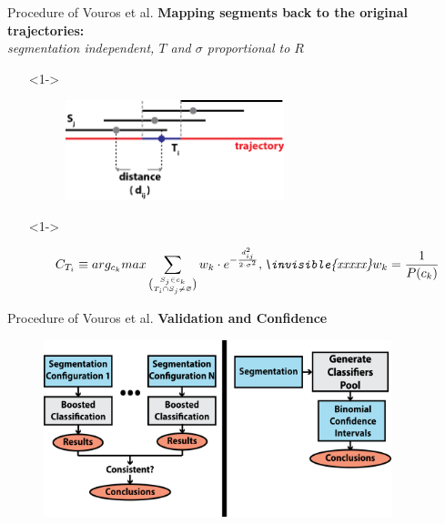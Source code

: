 \documentclass{beamer}
\begin{document}
{\begin{frame}{Procedure of Vouros et al.}
	\textbf{Mapping segments back to the original trajectories:}\\ 
	\textit{segmentation independent, $T$ and $\sigma$ proportional to $R$}
	\vspace{5mm}	
	\begin{itemize}[leftmargin=-2mm]
		\setlength\itemsep{2.3em}
		\item[]<1-> 	
		\begin{figure}[H]
			\centering
			\includegraphics[width=0.6\textwidth]{figures/intervals2}
		\end{figure}
		\item[]<1-> 
		\begin{large}	
			\begin{equation*}
			C_{T_i} \equiv arg_{c_k}max\sum_{\binom{S_j \in c_k}{T_i\cap S_j\neq\varnothing}} w_k \cdot e^{-\frac{d_{ij}^2}{2 \cdot \sigma^2}},
			\textit{\invisible{xxxxx}}w_k = \frac{1}{P(c_k)}
			\end{equation*}	
		\end{large}
	\end{itemize}
\end{frame}

\begin{frame}{Procedure of Vouros et al.}
	\textbf{Validation and Confidence}
	\vspace{5mm}
	\begin{figure}[H]
		\centering
		\includegraphics[width=0.9\textwidth]{figures/testing}
	\end{figure}
	\vspace{15mm}
\end{frame}

}
\end{document}
